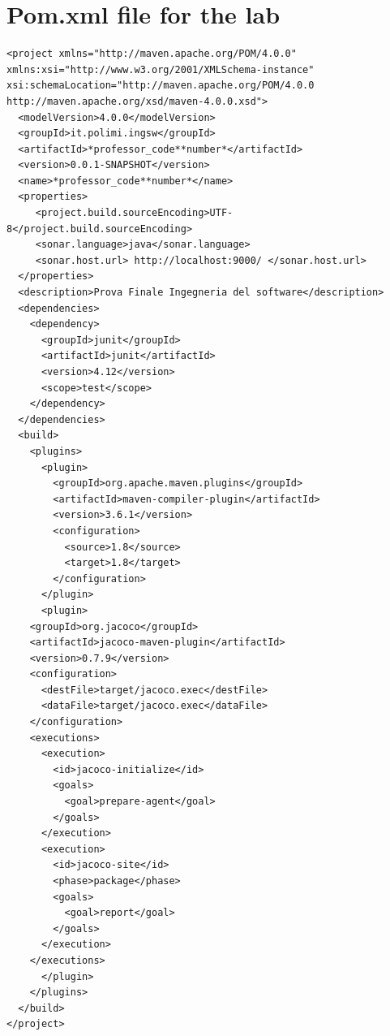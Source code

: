 \documentclass{article}
\begin{document}
\section{Pom.xml file for the lab}

\begin{lstlisting}
<project xmlns="http://maven.apache.org/POM/4.0.0" xmlns:xsi="http://www.w3.org/2001/XMLSchema-instance" xsi:schemaLocation="http://maven.apache.org/POM/4.0.0 http://maven.apache.org/xsd/maven-4.0.0.xsd">
  <modelVersion>4.0.0</modelVersion>
  <groupId>it.polimi.ingsw</groupId> 
  <artifactId>*professor_code**number*</artifactId> 
  <version>0.0.1-SNAPSHOT</version>
  <name>*professor_code**number*</name>
  <properties>
     <project.build.sourceEncoding>UTF-8</project.build.sourceEncoding>
     <sonar.language>java</sonar.language>
     <sonar.host.url> http://localhost:9000/ </sonar.host.url>
  </properties>
  <description>Prova Finale Ingegneria del software</description>
  <dependencies>
    <dependency>
      <groupId>junit</groupId>
      <artifactId>junit</artifactId>
      <version>4.12</version>
      <scope>test</scope>
    </dependency>
  </dependencies>
  <build>
    <plugins>
      <plugin>
        <groupId>org.apache.maven.plugins</groupId>
        <artifactId>maven-compiler-plugin</artifactId>
        <version>3.6.1</version>
        <configuration>
          <source>1.8</source>
          <target>1.8</target>
        </configuration>
      </plugin>
      <plugin>
	<groupId>org.jacoco</groupId>
	<artifactId>jacoco-maven-plugin</artifactId>
	<version>0.7.9</version>
	<configuration>
	  <destFile>target/jacoco.exec</destFile>
	  <dataFile>target/jacoco.exec</dataFile>
	</configuration>
	<executions>
	  <execution>
	    <id>jacoco-initialize</id>
	    <goals>
	      <goal>prepare-agent</goal>
	    </goals>
	  </execution>
	  <execution>
	    <id>jacoco-site</id>
	    <phase>package</phase>
	    <goals>
	      <goal>report</goal>
	    </goals>
	  </execution>
	</executions>
      </plugin>
    </plugins>
  </build>
</project>
\end{lstlisting}

\fi
\end{document}
